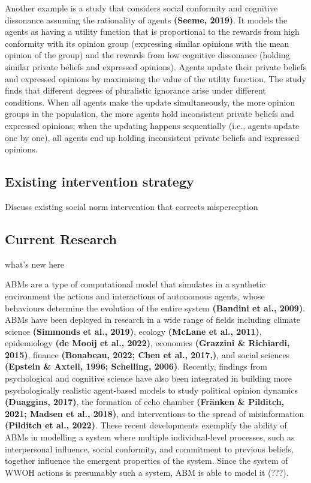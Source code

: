 \documentclass[
  11pt,
]{article}
\begin{document}
Another example is a study that considers social conformity and
cognitive dissonance assuming the rationality of agents \textbf{(Seeme,
2019)}. It models the agents as having a utility function that is
proportional to the rewards from high conformity with its opinion group
(expressing similar opinions with the mean opinion of the group) and the
rewards from low cognitive dissonance (holding similar private beliefs
and expressed opinions). Agents update their private beliefs and
expressed opinions by maximising the value of the utility function. The
study finds that different degrees of pluralistic ignorance arise under
different conditions. When all agents make the update simultaneously,
the more opinion groups in the population, the more agents hold
inconsistent private beliefs and expressed opinions; when the updating
happens sequentially (i.e., agents update one by one), all agents end up
holding inconsistent private beliefs and expressed opinions.

\hypertarget{existing-intervention-strategy}{%
\subsection{Existing intervention
strategy}\label{existing-intervention-strategy}}

Discuss existing social norm intervention that corrects misperception

\hypertarget{current-research}{%
\subsection{Current Research}\label{current-research}}

what's new here

ABMs are a type of computational model that simulates in a synthetic
environment the actions and interactions of autonomous agents, whose
behaviours determine the evolution of the entire system \textbf{(Bandini
et al., 2009)}. ABMs have been deployed in research in a wide range of
fields including climate science \textbf{(Simmonds et al., 2019)},
ecology \textbf{(McLane et al., 2011)}, epidemiology \textbf{(de Mooij
et al., 2022)}, economics \textbf{(Grazzini \& Richiardi, 2015)},
finance \textbf{(Bonabeau, 2022; Chen et al., 2017,)}, and social
sciences \textbf{(Epstein \& Axtell, 1996; Schelling, 2006)}. Recently,
findings from psychological and cognitive science have also been
integrated in building more psychologically realistic agent-based models
to study political opinion dynamics \textbf{(Duaggins, 2017)}, the
formation of echo chamber \textbf{(Fränken \& Pilditch, 2021; Madsen et
al., 2018)}, and interventions to the spread of misinformation
\textbf{(Pilditch et al., 2022)}. These recent developments exemplify
the ability of ABMs in modelling a system where multiple
individual-level processes, such as interpersonal influence, social
conformity, and commitment to previous beliefs, together influence the
emergent properties of the system. Since the system of WWOH actions is
presumably such a system, ABM is able to model it (???).
\end{document}
